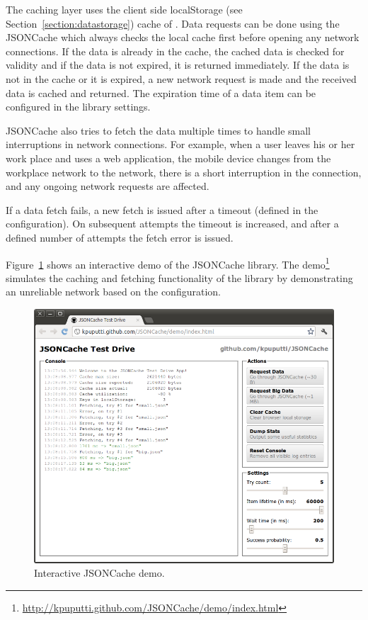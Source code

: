 The caching layer uses the client side localStorage (see
Section~\ref{section:datastorage}) cache of . Data
requests can be done using the JSONCache  which always
checks the local cache first before opening any network
connections. If the data is already in the cache, the cached data is
checked for validity and if the data is not expired, it is returned
immediately. If the data is not in the cache or it is expired, a new
network request is made and the received data is cached and
returned. The expiration time of a data item can be configured in the
library settings.

JSONCache also tries to fetch the data multiple times to handle small
interruptions in network connections.  For example, when a user leaves
his or her work place and uses a web application, the mobile device
changes from the workplace  network to the 
network, there is a short interruption in the connection, and any
ongoing network requests are affected.

If a data fetch fails, a new fetch is issued after a timeout (defined
in the configuration). On subsequent attempts the timeout is
increased, and after a defined number of attempts the fetch error is
issued.

Figure~\ref{figure:jsoncache-demo.png} shows an interactive demo of
the JSONCache library. The
demo\footnote{\url{http://kpuputti.github.com/JSONCache/demo/index.html}}
simulates the caching and fetching functionality of the library by
demonstrating an unreliable network based on the configuration.

\begin{figure}[h!]
  \begin{center}
    \includegraphics[width=\textwidth]{images/jsoncache-demo.png}
    \caption{Interactive JSONCache demo.}
    \label{figure:jsoncache-demo.png}
  \end{center}
\end{figure}

